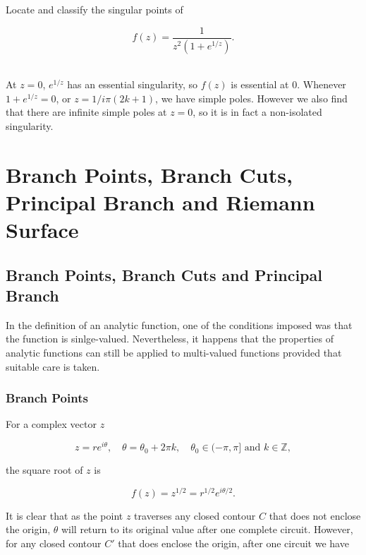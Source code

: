 \documentclass[english,a4paper,12pt]{report}
\begin{document}
{Locate and classify the singular points of 

\begin{equation}
    f(z) = \frac{1}{z^2(1+e^{1 /z} )}.
\end{equation}
~
}
{At \(z = 0\), \(e^{1/z} \) has an essential singularity, so \(f(z)\) is essential at 0. Whenever \(1+e^{1/z} = 0\), or \(z = 1/i \pi (2k+1)\), we have simple poles. However we also find that there are infinite simple poles at \(z = 0\), so it is in fact a non-isolated singularity.}


\section{Branch Points, Branch Cuts, Principal Branch and Riemann Surface}

\subsection{Branch Points, Branch Cuts and Principal Branch}

In the definition of an analytic function, one of the conditions imposed was that the function is sinlge-valued. Nevertheless, it happens that the properties of analytic functions can still be applied to multi-valued functions provided that suitable care is taken. 

\subsubsection{Branch Points}

For a complex vector \(z\)

\begin{equation}
    z = re^{i \theta }, \quad \theta  = \theta _{0} + 2\pi k , \quad \theta _{0} \in (-\pi ,\pi ] \text { and } k \in \mathbb{Z},  
\end{equation}

the square root of \(z\) is

\begin{equation}
    f(z) = z^{1/2} = r^{1 /2} e^{i \theta /2}.
\end{equation}

It is clear that as the point \(z\) traverses any closed contour \(C\) that does not enclose the origin, \(\theta \) will return to its original value after one complete circuit. However, for any closed contour \(C'\) that does enclose the origin, after one circuit we have 
\end{document}
